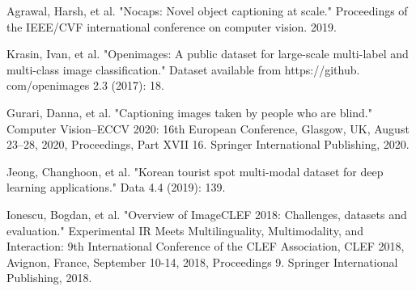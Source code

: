 \documentclass[runningheads]{llncs}
\begin{document}
\begin{thebibliography}{8}
Agrawal, Harsh, et al. "Nocaps: Novel object captioning at scale." Proceedings of the IEEE/CVF international conference on computer vision. 2019.

Krasin, Ivan, et al. "Openimages: A public dataset for large-scale multi-label and multi-class image classification." Dataset available from https://github. com/openimages 2.3 (2017): 18.

Gurari, Danna, et al. "Captioning images taken by people who are blind." Computer Vision–ECCV 2020: 16th European Conference, Glasgow, UK, August 23–28, 2020, Proceedings, Part XVII 16. Springer International Publishing, 2020.

Jeong, Changhoon, et al. "Korean tourist spot multi-modal dataset for deep learning applications." Data 4.4 (2019): 139.

Ionescu, Bogdan, et al. "Overview of ImageCLEF 2018: Challenges, datasets and evaluation." Experimental IR Meets Multilinguality, Multimodality, and Interaction: 9th International Conference of the CLEF Association, CLEF 2018, Avignon, France, September 10-14, 2018, Proceedings 9. Springer International Publishing, 2018.

\end{thebibliography}
\end{document}
